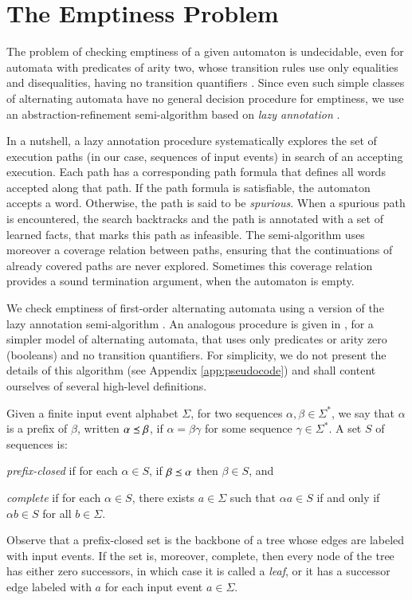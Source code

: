 \documentclass{llncs}
\begin{document}
\section{The Emptiness Problem}
\label{sec:emptiness}

The problem of checking emptiness of a given automaton is undecidable,
even for automata with predicates of arity two, whose transition rules
use only equalities and disequalities, having no transition
quantifiers \cite{Farzan15}. Since even such simple classes of
alternating automata have no general decision procedure for emptiness,
we use an abstraction-refinement semi-algorithm based on \emph{lazy
  annotation} \cite{McMillan06,McMillan14}.

In a nutshell, a lazy annotation procedure systematically explores the
set of execution paths (in our case, sequences of input events) in
search of an accepting execution. Each path has a corresponding path
formula that defines all words accepted along that path. If the path
formula is satisfiable, the automaton accepts a word. Otherwise, the
path is said to be \emph{spurious}. When a spurious path is
encountered, the search backtracks and the path is annotated with a
set of learned facts, that marks this path as infeasible. The
semi-algorithm uses moreover a coverage relation between paths,
ensuring that the continuations of already covered paths are never
explored. Sometimes this coverage relation provides a sound
termination argument, when the automaton is empty.

We check emptiness of first-order alternating automata using a version
of the \impact~ lazy annotation semi-algorithm \cite{McMillan06}. An
analogous procedure is given in \cite{IosifXu18}, for a simpler model
of alternating automata, that uses only predicates or arity zero
(booleans) and no transition quantifiers. For simplicity, we do not
present the details of this algorithm (see Appendix
\ref{app:pseudocode}) and shall content ourselves of several
high-level definitions.

Given a finite input event alphabet $\Sigma$, for two sequences
$\alpha, \beta \in \Sigma^*$, we say that $\alpha$ is a prefix of
$\beta$, written $\alpha \preceq \beta$, if $\alpha=\beta\gamma$ for
some sequence $\gamma\in\Sigma^*$. A set $S$ of sequences
is: \begin{compactitem}
\item \emph{prefix-closed} if for each $\alpha \in S$, if $\beta \preceq
\alpha$ then $\beta \in S$, and
\item \emph{complete} if for each $\alpha \in S$, there exists $a \in
  \Sigma$ such that $\alpha a \in S$ if and only if $\alpha b \in S$
  for all $b \in \Sigma$. 
\end{compactitem}
Observe that a prefix-closed set is the backbone of a tree whose edges
are labeled with input events. If the set is, moreover, complete, then
every node of the tree has either zero successors, in which case it is
called a \emph{leaf}, or it has a successor edge labeled with $a$ for
each input event $a \in \Sigma$. 
\end{document}
